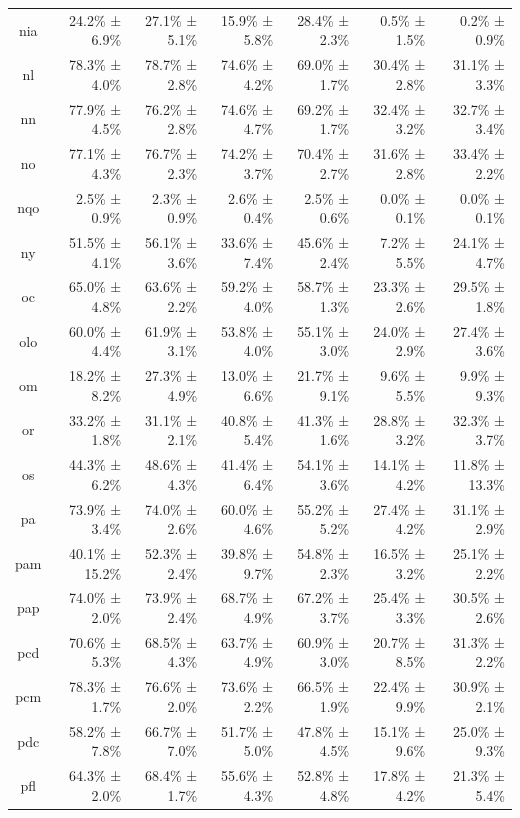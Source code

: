 \documentclass[10pt, a4paper]{article}
\begin{document}
\begin{table}[h]
\begin{tabular}{crrrrrr}
nia & 24.2\% ± 6.9\% & 27.1\% ± 5.1\% & 15.9\% ± 5.8\% & 28.4\% ± 2.3\% & 0.5\% ± 1.5\% & 0.2\% ± 0.9\% \\
nl & 78.3\% ± 4.0\% & 78.7\% ± 2.8\% & 74.6\% ± 4.2\% & 69.0\% ± 1.7\% & 30.4\% ± 2.8\% & 31.1\% ± 3.3\% \\
nn & 77.9\% ± 4.5\% & 76.2\% ± 2.8\% & 74.6\% ± 4.7\% & 69.2\% ± 1.7\% & 32.4\% ± 3.2\% & 32.7\% ± 3.4\% \\
no & 77.1\% ± 4.3\% & 76.7\% ± 2.3\% & 74.2\% ± 3.7\% & 70.4\% ± 2.7\% & 31.6\% ± 2.8\% & 33.4\% ± 2.2\% \\
nqo & 2.5\% ± 0.9\% & 2.3\% ± 0.9\% & 2.6\% ± 0.4\% & 2.5\% ± 0.6\% & 0.0\% ± 0.1\% & 0.0\% ± 0.1\% \\
ny & 51.5\% ± 4.1\% & 56.1\% ± 3.6\% & 33.6\% ± 7.4\% & 45.6\% ± 2.4\% & 7.2\% ± 5.5\% & 24.1\% ± 4.7\% \\
oc & 65.0\% ± 4.8\% & 63.6\% ± 2.2\% & 59.2\% ± 4.0\% & 58.7\% ± 1.3\% & 23.3\% ± 2.6\% & 29.5\% ± 1.8\% \\
olo & 60.0\% ± 4.4\% & 61.9\% ± 3.1\% & 53.8\% ± 4.0\% & 55.1\% ± 3.0\% & 24.0\% ± 2.9\% & 27.4\% ± 3.6\% \\
om & 18.2\% ± 8.2\% & 27.3\% ± 4.9\% & 13.0\% ± 6.6\% & 21.7\% ± 9.1\% & 9.6\% ± 5.5\% & 9.9\% ± 9.3\% \\
or & 33.2\% ± 1.8\% & 31.1\% ± 2.1\% & 40.8\% ± 5.4\% & 41.3\% ± 1.6\% & 28.8\% ± 3.2\% & 32.3\% ± 3.7\% \\
os & 44.3\% ± 6.2\% & 48.6\% ± 4.3\% & 41.4\% ± 6.4\% & 54.1\% ± 3.6\% & 14.1\% ± 4.2\% & 11.8\% ± 13.3\% \\
pa & 73.9\% ± 3.4\% & 74.0\% ± 2.6\% & 60.0\% ± 4.6\% & 55.2\% ± 5.2\% & 27.4\% ± 4.2\% & 31.1\% ± 2.9\% \\
pam & 40.1\% ± 15.2\% & 52.3\% ± 2.4\% & 39.8\% ± 9.7\% & 54.8\% ± 2.3\% & 16.5\% ± 3.2\% & 25.1\% ± 2.2\% \\
pap & 74.0\% ± 2.0\% & 73.9\% ± 2.4\% & 68.7\% ± 4.9\% & 67.2\% ± 3.7\% & 25.4\% ± 3.3\% & 30.5\% ± 2.6\% \\
pcd & 70.6\% ± 5.3\% & 68.5\% ± 4.3\% & 63.7\% ± 4.9\% & 60.9\% ± 3.0\% & 20.7\% ± 8.5\% & 31.3\% ± 2.2\% \\
pcm & 78.3\% ± 1.7\% & 76.6\% ± 2.0\% & 73.6\% ± 2.2\% & 66.5\% ± 1.9\% & 22.4\% ± 9.9\% & 30.9\% ± 2.1\% \\
pdc & 58.2\% ± 7.8\% & 66.7\% ± 7.0\% & 51.7\% ± 5.0\% & 47.8\% ± 4.5\% & 15.1\% ± 9.6\% & 25.0\% ± 9.3\% \\
pfl & 64.3\% ± 2.0\% & 68.4\% ± 1.7\% & 55.6\% ± 4.3\% & 52.8\% ± 4.8\% & 17.8\% ± 4.2\% & 21.3\% ± 5.4\% \\

\end{tabular}
\end{table}
\end{document}
